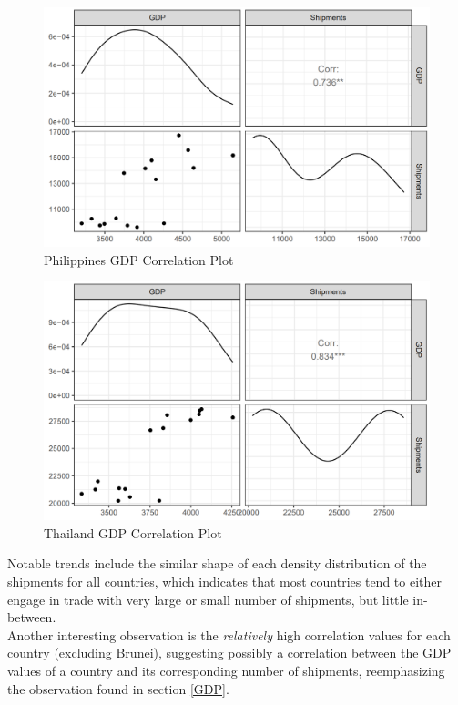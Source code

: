 \documentclass{article}
\begin{document}
\begin{figure}[H]
    \centering
    \includegraphics[width=1\textwidth]{images/Line Plots/Philippines/Philippines_Corrplot.png}
    \caption{Philippines GDP Correlation Plot}
    \label{fig:my_label}
\end{figure}

\begin{figure}[H]
    \centering
    \includegraphics[width=1\textwidth]{images/Line Plots/Thailand/Thailand_Corrplot.png}
    \caption{Thailand GDP Correlation Plot}
    \label{fig:my_label}
\end{figure}

\noindent Notable trends include the similar shape of each density distribution of the shipments for all countries, which indicates that most countries tend to either engage in trade with very large or small number of shipments, but little in-between. \\

\noindent Another interesting observation is the \textit{relatively} high correlation values for each country (excluding Brunei), suggesting possibly a correlation between the GDP values of a country and its corresponding number of shipments, reemphasizing the observation found in section \ref{GDP}.
\end{document}
